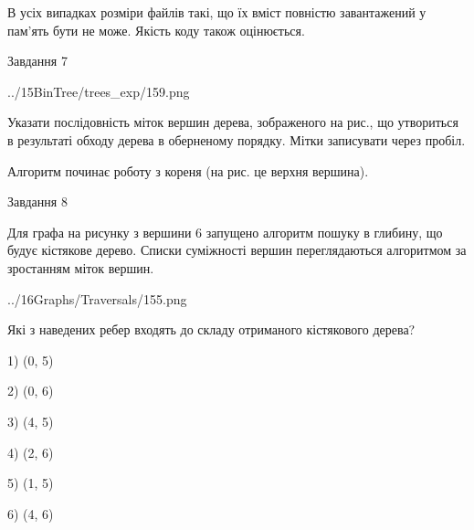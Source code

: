 \documentclass[12pt, ukrainian]{article}
\begin{document}
{В усіх випадках розміри файлів такі, що їх вміст повністю завантажений у пам'ять бути не може. Якість коду також оцінюється.



\vspace{10mm}\par

\newpage
\begin{minipage}[t]{9.7cm}
               
{\begin{center}Завдання {7}\end{center}}
\vspace{-4mm}

\begin{center}
	{../15BinTree/trees_exp/159.png}
\end{center}
Указати послідовність міток вершин дерева, зображеного на рис., що утвориться в результаті обходу дерева в оберненому порядку. Мітки записувати через пробіл.\par Алгоритм починає роботу з кореня (на рис. це верхня вершина).\par

\end{minipage}
\vline \hspace{8mm}
\begin{minipage}[t]{8.0cm}
               
{\begin{center}Завдання {8}\end{center}}
\vspace{-4mm}
Для графа на рисунку з вершини 6 запущено алгоритм пошуку в глибину, що будує кістякове дерево. Списки суміжності вершин переглядаються алгоритмом за зростанням міток вершин.\par
\begin{center}
	{../16Graphs/Traversals/155.png}
\end{center}
\par Які з наведених ребер входять до складу отриманого кістякового дерева?\par
1) (0, 5)\par
2) (0, 6)\par
3) (4, 5)\par
4) (2, 6)\par
5) (1, 5)\par
6) (4, 6)\par
{\vskip 15pt} \par


\end{minipage}}
\end{document}
